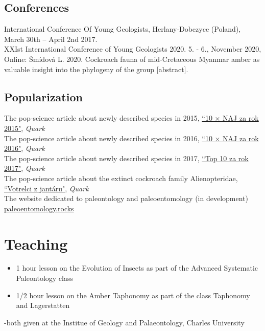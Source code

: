 \documentclass[11pt]{article} %
\begin{document}
\subsection*{Conferences}

 International Conference Of Young Geologists, Herlany-Dobczyce (Poland), March 30th – April 2nd 2017.\\
 XXIst International Conference of Young Geologists 2020. 5. - 6., November 2020, Online:
Šmídová L. 2020. Cockroach fauna of mid-Cretaceous Myanmar amber as valuable insight into the phylogeny of the group [abstract].




\subsection*{Popularization}

 The pop-science article about newly described species in 2015, \href{https://www.quark.sk/10-x-naj-za-rok-2015/}{“10 × NAJ za rok 2015"}, \emph{Quark}\\
  The pop-science article about newly described species in 2016, \href{https://www.quark.sk/10-x-naj-za-rok-2016/}{“10 × NAJ za rok 2016"}, \emph{Quark}\\
  The pop-science article about newly described species in 2017, \href{https://www.quark.sk/top-10-za-rok-2017/}{“Top 10 za rok 2017"}, \emph{Quark}\\
  The pop-science article about the extinct cockroach family Alienopteridae, \href{https://www.quark.sk/votrelci-z-jantaru/}{“Votrelci z jantáru"}, \emph{Quark}\\
  The website dedicated to paleontology and paleoentomology (in development) \href{https://www.paleoentomology.rocks/}{paleoentomology.rocks}\\


\section*{Teaching}
\begin{itemize}
\itemsep -0.5em
\item 1 hour lesson on the Evolution of Insects as part of the Advanced Systematic Paleontology class  
 \item1/2 hour lesson on the Amber Taphonomy as part of the class Taphonomy and Lagerstatten 
\end{itemize}
-both given at the Institue of Geology and Palaeontology, Charles University
\end{document}
